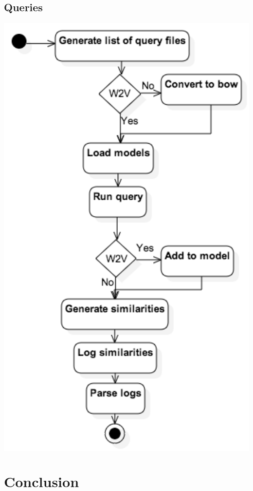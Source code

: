 \subsection{Queries}
\includegraphics[width=15cm]{Figures/ArchictectureQueryUML.png}

\section{Conclusion}
